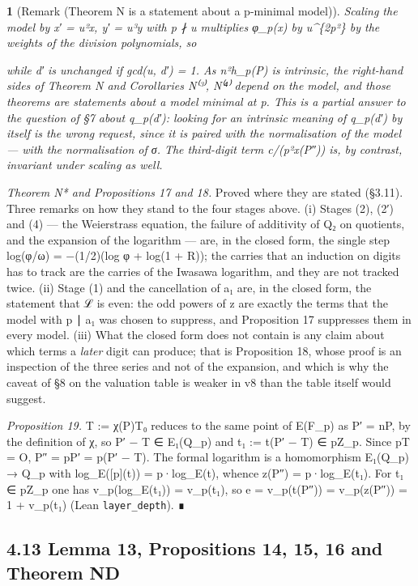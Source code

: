\documentclass[11pt,a4paper]{article}
\theoremstyle{named}
\newtheorem*{namedthm}{}
\newcommand{\dispf}[1]{\par\smallskip{\centering #1\par}\smallskip}
\begin{document}
\begin{namedthm}[Remark (Theorem N is a statement about a p-minimal model)]
Scaling the model by x′ = u²x, y′ = u³y with p ∤ u multiplies φ\_p(x) by u\textasciicircum{}\{2p²\} by the weights of the division polynomials, so
\dispf{\textbf{Θ ↦ Θ + 2p·q\_p(u)  (mod p²)},}
while d′ is unchanged if gcd(u, d′) = 1. As n²h\_p(P) is intrinsic, the right-hand sides of Theorem N and Corollaries N⁽³⁾, N⁽⁴⁾ depend on the model, and those theorems are statements about a model minimal at p. This is a partial answer to the question of §7 about q\_p(d′): looking for an intrinsic meaning of q\_p(d′) by itself is the wrong request, since it is paired with the normalisation of the model — with the normalisation of σ. The third-digit term c/(p²x(P″)) is, by contrast, invariant under scaling as well.
\end{namedthm}

\textit{Theorem N* and Propositions 17 and 18.} Proved where they are stated (§3.11). Three remarks on how they stand to the four stages above. (i) Stages (2), (2′) and (4) — the Weierstrass equation, the failure of additivity of Q₂ on quotients, and the expansion of the logarithm — are, in the closed form, the single step log(φ/ω) = −(1/2)(log φ + log(1 + R)); the carries that an induction on digits has to track are the carries of the Iwasawa logarithm, and they are not tracked twice. (ii) Stage (1) and the cancellation of a₁ are, in the closed form, the statement that ℒ is even: the odd powers of z are exactly the terms that the model with p ∣ a₁ was chosen to suppress, and Proposition 17 suppresses them in every model. (iii) What the closed form does not contain is any claim about which terms a \textit{later} digit can produce; that is Proposition 18, whose proof is an inspection of the three series and not of the expansion, and which is why the caveat of §8 on the valuation table is weaker in v8 than the table itself would suggest.

\textit{Proposition 19.} T := χ(P)T₀ reduces to the same point of E(F\_p) as P′ = nP, by the definition of χ, so P′ − T ∈ E₁(Q\_p) and t₁ := t(P′ − T) ∈ pZ\_p. Since pT = O, P″ = pP′ = p(P′ − T). The formal logarithm is a homomorphism E₁(Q\_p) → Q\_p with log\_E([p](t)) = p·log\_E(t), whence z(P″) = p·log\_E(t₁). For t₁ ∈ pZ\_p one has v\_p(log\_E(t₁)) = v\_p(t₁), so e = v\_p(t(P″)) = v\_p(z(P″)) = 1 + v\_p(t₁) (Lean \texttt{layer\_\allowbreak{}depth}). ∎

\subsection*{4.13 Lemma 13, Propositions 14, 15, 16 and Theorem ND}
\end{document}

